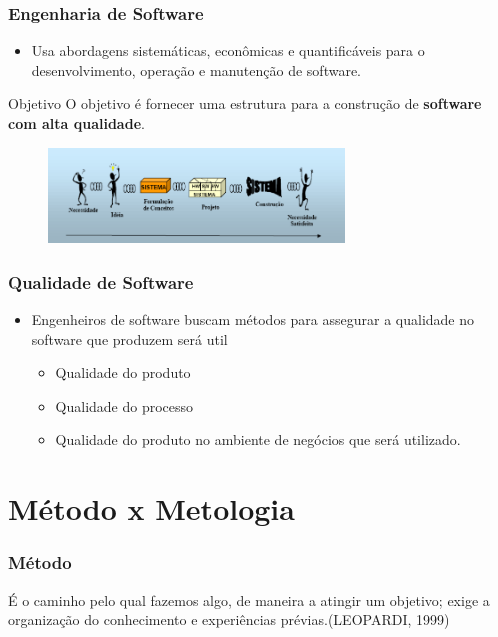 \begin{frame}
 \frametitle{Engenharia de Software}
 \begin{itemize}
  \item Usa abordagens sistemáticas, econômicas e quantificáveis para o desenvolvimento, operação e manutenção de software.
 \end{itemize}
\begin{block}{Objetivo}
 O objetivo é fornecer uma estrutura para a construção de \textbf{software com alta qualidade}.
\end{block}
\begin{figure}
 \centering
 \includegraphics[width = 0.7\textwidth]{figs/fig3.png}
\end{figure}
\end{frame}


\begin{frame}
 \frametitle{Qualidade de Software}
 \begin{itemize}
  \item Engenheiros de software buscam métodos para assegurar a qualidade no software que
produzem será util
\begin{itemize}
 \item Qualidade do produto
 \item Qualidade do processo
 \item  Qualidade do produto no ambiente de negócios que será utilizado.
\end{itemize}
 \end{itemize}
\end{frame}

\section{Método x Metologia}
\begin{frame}
 \frametitle{Método}
 \begin{center}
  \begin{block}{}
  É o caminho pelo qual fazemos algo, de maneira a atingir um objetivo; exige a
organização do conhecimento e experiências prévias.(LEOPARDI, 1999) 
  \end{block}
 \end{center}
\end{frame}

